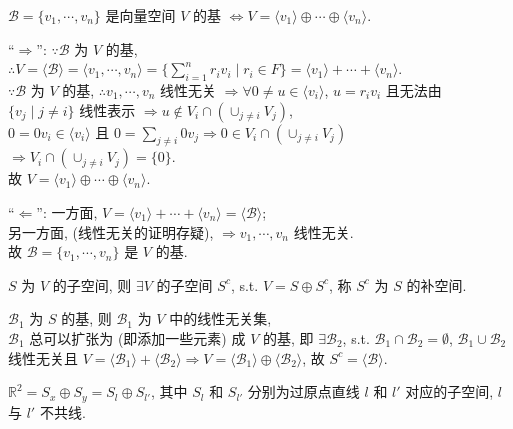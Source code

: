 \documentclass{note}
\begin{document}
\begin{thm}[(课本定理 1.8)]
    $\mathcal{B}=\{v_1,\cdots,v_n\}$ 是向量空间 $V$ 的基 $\Longleftrightarrow V=\langle v_1\rangle\oplus\cdots\oplus\langle v_n\rangle$.
\end{thm}
\begin{pf}
    ``$\Longrightarrow$'': $\because\mathcal{B}$ 为 $V$ 的基, $\therefore V=\langle\mathcal{B}\rangle=\langle v_1,\cdots,v_n\rangle=\{\sum_{i=1}^nr_iv_i\mid r_i\in F\}=\langle v_1\rangle+\cdots+\langle v_n\rangle$.\\
    $\because\mathcal{B}$ 为 $V$ 的基, $\therefore v_1,\cdots,v_n$ 线性无关 $\Longrightarrow\forall 0\neq u\in\langle v_i\rangle$, $u=r_iv_i$ 且无法由 $\{v_j\mid j\neq i\}$ 线性表示 $\Longrightarrow u\notin V_i\cap(\cup_{j\neq i}V_j)$,\\
    $0=0v_i\in\langle v_i\rangle$ 且 $0=\sum_{j\neq i}0v_j\Longrightarrow 0\in V_i\cap(\cup_{j\neq i}V_j)$\\
    $\Longrightarrow V_i\cap(\cup_{j\neq i}V_j)=\{0\}$.\\
    故 $V=\langle v_1\rangle\oplus\cdots\oplus\langle v_n\rangle$.

    ``$\Longleftarrow$'': 一方面, $V=\langle v_1\rangle+\cdots+\langle v_n\rangle=\langle\mathcal{B}\rangle$;\\
    另一方面, (线性无关的证明存疑), $\Longrightarrow v_1,\cdots,v_n$ 线性无关.\\
    故 $\mathcal{B}=\{v_1,\cdots,v_n\}$ 是 $V$ 的基.
\end{pf}

\begin{thm}[(课本定理 1.4)]
    $S$ 为 $V$ 的子空间, 则 $\exists V$ 的子空间 $S^c$, s.t. $V=S\oplus S^c$, 称 $S^c$ 为 $S$ 的补空间.
\end{thm}
\begin{pf}
    $\mathcal{B}_1$ 为 $S$ 的基, 则 $\mathcal{B}_1$ 为 $V$ 中的线性无关集,\\
    $\mathcal{B}_1$ 总可以扩张为 (即添加一些元素) 成 $V$ 的基, 即 $\exists\mathcal{B}_2$, s.t. $\mathcal{B}_1\cap\mathcal{B}_2=\emptyset$, $\mathcal{B}_1\cup\mathcal{B}_2$ 线性无关且 $V=\langle\mathcal{B}_1\rangle+\langle\mathcal{B}_2\rangle\Longrightarrow V=\langle\mathcal{B}_1\rangle\oplus\langle\mathcal{B}_2\rangle$, 故 $S^c=\langle\mathcal{B}\rangle$.
\end{pf}

\begin{eg}
    $\mathbb{R}^2=S_x\oplus S_y=S_l\oplus S_{l'}$, 其中 $S_l$ 和 $S_{l'}$ 分别为过原点直线 $l$ 和 $l'$ 对应的子空间, $l$ 与 $l'$ 不共线.
\end{eg}
\end{document}
